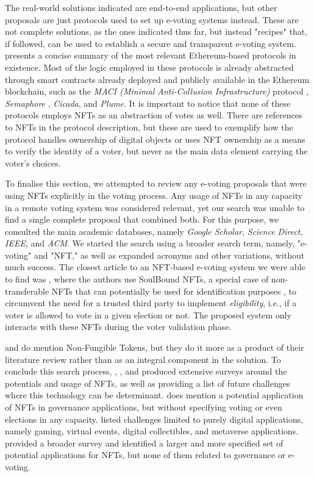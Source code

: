 \documentclass[../main.tex]{subfiles}
\begin{document}
\par
The real-world solutions indicated are end-to-end applications, but other proposals are just protocols used to set up e-voting systems instead. These are not complete solutions, as the ones indicated thus far, but instead "recipes" that, if followed, can be used to establish a secure and transparent e-voting system. \cite{Lamtzidis2023} presents a concise summary of the most relevant Ethereum-based protocols in existence. Most of the logic employed in these protocols is already abstracted through smart contracts already deployed and publicly available in the Ethereum blockchain, such as the \textit{MACI (Minimal Anti-Collusion Infrastructure)} protocol \cite{MACI2024}, \textit{Semaphore} \cite{Semaphore2024}, \textit{Cicada}, and \textit{Plume}. It is important to notice that none of these protocols employs NFTs as an abstraction of votes as well. There are references to NFTs in the protocol description, but these are used to exemplify how the protocol handles ownership of digital objects or uses NFT ownership as a means to verify the identity of a voter, but never as the main data element carrying the voter's choices.
\par
To finalise this section, we attempted to review any e-voting proposals that were using NFTs explicitly in the voting process. Any usage of NFTs in any capacity in a remote voting system was considered relevant, yet our search was unable to find a single complete proposal that combined both. For this purpose, we consulted the main academic databases, namely \textit{Google Scholar}, \textit{Science Direct}, \textit{IEEE}, and \textit{ACM}. We started the search using a broader search term, namely, "e-voting" and "NFT," as well as expanded acronyms and other variations, without much success. The closest article to an NFT-based e-voting system we were able to find was \cite{Sagar2023}, where the authors use SoulBound NFTs, a special case of non-transferable NFTs that can potentially be used for identification purposes \cite{Weyl2022}, to circumvent the need for a trusted third party to implement \textit{eligibility}, i.e., if a voter is allowed to vote in a given election or not. The proposed system only interacts with these NFTs during the voter validation phase.
\par
\cite{Bistarelli2022} and \cite{Agbesi2019} do mention Non-Fungible Tokens, but they do it more as a product of their literature review rather than as an integral component in the solution. To conclude this search process, \cite{Ali2023}, \cite{Bao2022}, and \cite{Wang2021} produced extensive surveys around the potentials and usage of NFTs, as well as providing a list of future challenges where this technology can be determinant. \cite{Ali2023} does mention a potential application of NFTs in governance applications, but without specifying voting or even elections in any capacity. \cite{Wang2021} listed challenges limited to purely digital applications, namely gaming, virtual events, digital collectibles, and metaverse applications. \cite{Bao2022} provided a broader survey and identified a larger and more specified set of potential applications for NFTs, but none of them related to governance or e-voting.
\end{document}
